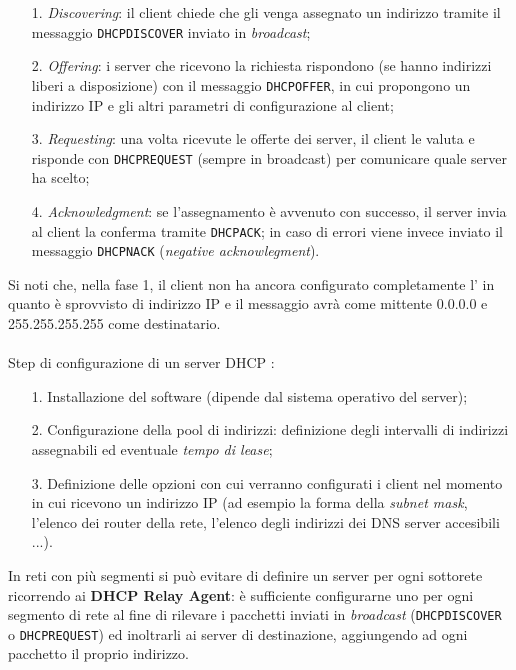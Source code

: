 \documentclass[a4paper,11pt]{article}
\def\code#1{\texttt{#1}}
\def\vedi#1{\nameref{#1}}
\def\italic#1{\textit{#1}}
\begin{document}
\begin{itemize}
	\item[1.] \italic{Discovering}: il client chiede che gli venga assegnato un indirizzo tramite il messaggio \code{DHCPDISCOVER} inviato in \textit{broadcast};
	\item[2.] \italic{Offering}: i server che ricevono la richiesta rispondono (se hanno indirizzi liberi a disposizione) con il messaggio \code{DHCPOFFER}, in cui propongono un indirizzo IP e gli altri parametri di configurazione al client;
	\item[3.] \italic{Requesting}: una volta ricevute le offerte dei server, il client le valuta e risponde con \code{DHCPREQUEST} (sempre in broadcast) per comunicare quale server ha scelto;
	\item[4.] \italic{Acknowledgment}: se l'assegnamento è avvenuto con successo, il server invia al client la conferma tramite \code{DHCPACK}; in caso di errori viene invece inviato il messaggio \code{DHCPNACK} (\italic{negative acknowlegment}).
\end{itemize}
Si noti che, nella fase 1, il client non ha ancora configurato completamente l'\vedi{Internet protocol suite (TCP/IP)} in quanto è sprovvisto di indirizzo IP e il messaggio avrà come mittente 0.0.0.0 e 255.255.255.255 come destinatario.
\\\\Step di configurazione di un server DHCP :
\begin{itemize}
	\item[1.] Installazione del software (dipende dal sistema operativo del server);
	\item[2.] Configurazione della pool di indirizzi: definizione degli intervalli di indirizzi assegnabili ed eventuale \italic{tempo di lease};
	\item[3.] Definizione delle opzioni con cui verranno configurati i client nel momento in cui ricevono un indirizzo IP (ad esempio la forma della \italic{subnet mask}, l'elenco dei router della rete, l'elenco degli indirizzi dei DNS server accesibili ...).
\end{itemize}
In reti con più segmenti si può evitare di definire un server per ogni sottorete ricorrendo ai \textbf{DHCP Relay Agent}: è sufficiente configurarne uno per ogni segmento di rete al fine di rilevare i pacchetti inviati in \italic{broadcast} (\code{DHCPDISCOVER} o \code{DHCPREQUEST}) ed inoltrarli ai server di destinazione, aggiungendo ad ogni pacchetto il proprio indirizzo.\\
\end{document}
